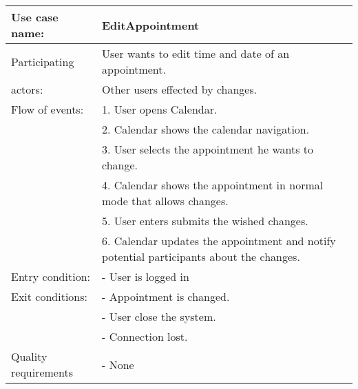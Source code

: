 {\tabulinesep=1.2mm
\begin{tabu}{ | p{3cm} | p{13cm} |}
    \hline
    Use case name: 			& 		EditAppointment\\ \hline
    Participating  			& 		User wants to edit time and date of an appointment. \\
    actors:					&		Other users effected by changes.\\ \hline
    Flow of events: 		& 		1. User opens Calendar. \\
							&		2. Calendar shows the calendar navigation.\\
							&		3. User selects the appointment he wants to change.\\
							&		4. Calendar shows the appointment in normal mode that allows changes.\\
							&		5. User enters submits the wished changes.\\
							&		6. Calendar updates the appointment and notify potential participants about the changes.\\ \hline
    Entry condition: 		& 		- User is logged in  \\ \hline
	Exit conditions: 		&		- Appointment is changed.\\
							&		- User close the system.\\
							&		- Connection lost.\\\hline
	Quality requirements	&	 	- None \\\hline
\end{tabu}
}
